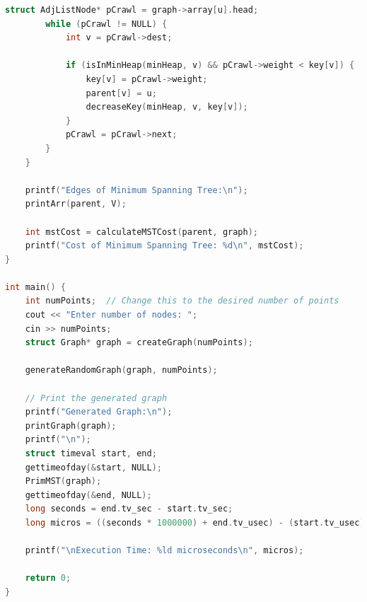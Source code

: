 \documentclass[a4paper, 10pt, twocolumn]{article}
\begin{document}
\begin{lstlisting}[language=C++, caption={C++ code for Efficient Prim's  Algorithm}]
        struct AdjListNode* pCrawl = graph->array[u].head;
        while (pCrawl != NULL) {
            int v = pCrawl->dest;

            if (isInMinHeap(minHeap, v) && pCrawl->weight < key[v]) {
                key[v] = pCrawl->weight;
                parent[v] = u;
                decreaseKey(minHeap, v, key[v]);
            }
            pCrawl = pCrawl->next;
        }
    }

    printf("Edges of Minimum Spanning Tree:\n");
    printArr(parent, V);

    int mstCost = calculateMSTCost(parent, graph);
    printf("Cost of Minimum Spanning Tree: %d\n", mstCost);
}

int main() {
	int numPoints;  // Change this to the desired number of points
	cout << "Enter number of nodes: ";
	cin >> numPoints;
    struct Graph* graph = createGraph(numPoints);

    generateRandomGraph(graph, numPoints);

    // Print the generated graph
    printf("Generated Graph:\n");
    printGraph(graph);
    printf("\n");
    struct timeval start, end;
    gettimeofday(&start, NULL);
    PrimMST(graph);
    gettimeofday(&end, NULL);
    long seconds = end.tv_sec - start.tv_sec;
    long micros = ((seconds * 1000000) + end.tv_usec) - (start.tv_usec);

    printf("\nExecution Time: %ld microseconds\n", micros);

    return 0;
}
\end{lstlisting}
\end{document}
